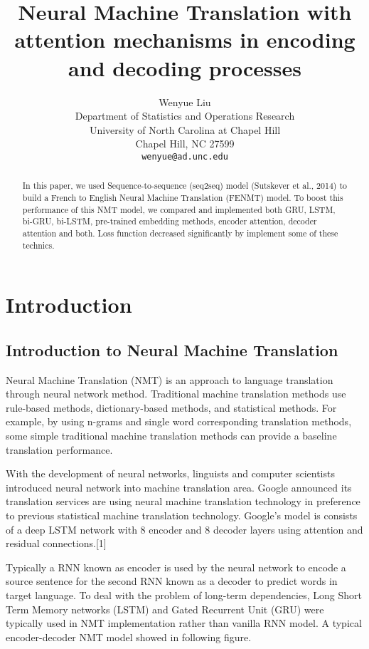 \documentclass{article}
\title{Neural Machine Translation with attention mechanisms in encoding and decoding processes}
\author{Wenyue Liu \\
  Department of Statistics and Operations Research\\
  University of North Carolina at Chapel Hill\\
  Chapel Hill, NC 27599 \\
  \texttt{wenyue@ad.unc.edu} \\
}
\begin{document}

\maketitle

\begin{abstract}
  In this paper, we used Sequence-to-sequence (seq2seq) model (Sutskever et al., 2014) to build a French to English Neural Machine Translation (FENMT) model. To boost this performance of this NMT model, we compared and implemented both GRU, LSTM, bi-GRU, bi-LSTM, pre-trained embedding methods, encoder attention, decoder attention and both. Loss function decreased significantly by implement some of these technics.
  
\end{abstract}

\section{Introduction}

\subsection{Introduction to Neural Machine Translation}
Neural Machine Translation (NMT) is an approach to language translation through neural network method. Traditional machine translation methods use rule-based methods, dictionary-based methods, and statistical methods. For example, by using n-grams and single word corresponding translation methods, some simple traditional machine translation methods can provide a baseline translation performance. 

With the development of neural networks, linguists and computer scientists introduced neural network into machine translation area. Google announced its translation services are using neural machine translation technology in preference to previous statistical machine translation technology. Google's model is consists of a deep LSTM network with 8 encoder and 8 decoder layers using attention and residual connections.[1] 

Typically a RNN known as encoder is used by the neural network to encode a source sentence for the second RNN known as a decoder to predict words in target language. To deal with the problem of long-term dependencies, Long Short Term Memory networks (LSTM) and Gated Recurrent Unit (GRU) were typically used in NMT implementation rather than vanilla RNN model. A typical encoder-decoder NMT model showed in following figure. 
\end{document}

